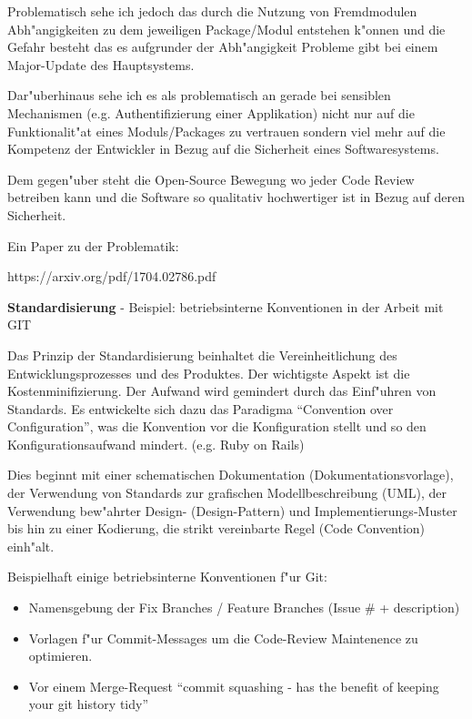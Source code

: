 Problematisch sehe ich jedoch das durch die Nutzung von Fremdmodulen Abh"angigkeiten zu dem jeweiligen Package/Modul entstehen k"onnen und die Gefahr besteht das es aufgrunder der Abh"angigkeit Probleme gibt bei einem Major-Update des Hauptsystems.


Dar"uberhinaus sehe ich es als problematisch an gerade bei sensiblen Mechanismen (e.g. Authentifizierung einer Applikation) nicht nur auf die Funktionalit"at eines Moduls/Packages zu vertrauen sondern viel mehr auf die Kompetenz der Entwickler in Bezug auf die Sicherheit eines Softwaresystems.

Dem gegen"uber steht die Open-Source Bewegung wo jeder Code Review betreiben kann und die Software so qualitativ hochwertiger ist in Bezug auf deren Sicherheit.

Ein Paper zu der Problematik: \par
https://arxiv.org/pdf/1704.02786.pdf


\newpage
\textbf{Standardisierung}
- Beispiel: betriebsinterne Konventionen in der Arbeit mit GIT

Das Prinzip der Standardisierung beinhaltet die Vereinheitlichung des Entwicklungsprozesses und des Produktes. Der wichtigste Aspekt ist die Kostenminifizierung. Der Aufwand wird gemindert durch das Einf"uhren von Standards.
Es entwickelte sich dazu das Paradigma ``Convention over Configuration'', was die Konvention vor die Konfiguration stellt und so den Konfigurationsaufwand mindert. (e.g. Ruby on Rails)

Dies beginnt mit einer schematischen Dokumentation (Dokumentationsvorlage),
der Verwendung von Standards zur grafischen Modellbeschreibung (UML),
der Verwendung bew"ahrter Design- (Design-Pattern) und Implementierungs-Muster
bis hin zu einer Kodierung, die strikt vereinbarte Regel (Code Convention) einh"alt.

Beispielhaft einige betriebsinterne Konventionen f"ur Git:
\begin{itemize}
  \item Namensgebung der Fix Branches / Feature Branches (Issue \# + description)
  \item Vorlagen f"ur Commit-Messages um die Code-Review Maintenence zu optimieren.
  \item Vor einem Merge-Request ``commit squashing - has the benefit of keeping your git history tidy''

\end{itemize}


\newpage
